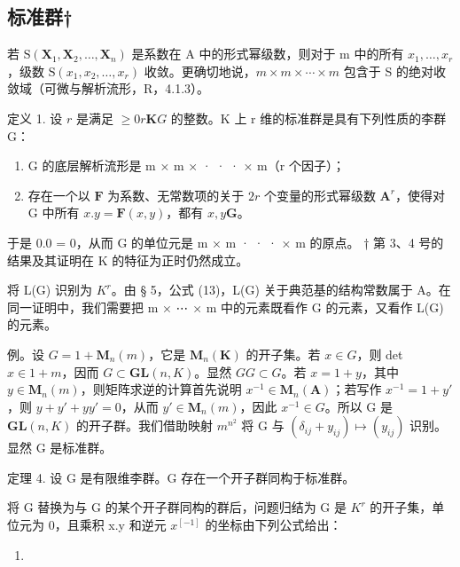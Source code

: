 \subsection{标准群†}

若 \(\mathrm{S}(\mathbf{X}_{1},\mathbf{X}_{2},\ldots,\mathbf{X}_{n})\) 是系数在 A 中的形式幂级数，则对于 m 中的所有 \(x_{1},\ldots,x_{r}\)，级数 \(\mathrm{S}(x_{1},x_{2},\ldots,x_{r})\) 收敛。更确切地说，\(m\times m\times\cdots\times m\) 包含于 S 的绝对收敛域（可微与解析流形，R，4.1.3）。

定义 1. 设 \(r\) 是满足 \(\geqslant 0\)\(r\)\(\mathbf{K}\)\(G\) 的整数。K 上 r 维的标准群是具有下列性质的李群 G：

\begin{enumerate}
\def\labelenumi{(\roman{enumi})}
\item
  G 的底层解析流形是 m × m × · · · × m（r 个因子）；
\item
  存在一个以 \(\mathbf{F}\) 为系数、无常数项的关于 \(2r\) 个变量的形式幂级数 \(\mathbf{A}^r\)，使得对 G 中所有 \(x.y = \mathbf{F}(x,y)\)，都有 \(x,y\)\(\mathbf{G}\)。
\end{enumerate}

于是 0.0 = 0，从而 G 的单位元是 m × m · · · × m 的原点。
† 第 3、4 号的结果及其证明在 K 的特征为正时仍然成立。

将 L(G) 识别为 \(K^r\)。由 § 5，公式 (13)，L(G) 关于典范基的结构常数属于 A。在同一证明中，我们需要把 m × ⋯ × m 中的元素既看作 G 的元素，又看作 L(G) 的元素。

例。设 \(G = 1 + \mathbf{M}_{n}(m)\)，它是 \(\mathbf{M}_{n}(\mathbf{K})\) 的开子集。若 \(x \in G\)，则 det \(x \in 1 + m\)，因而 \(G \subset \mathbf{GL}(n, K)\)。显然 \(GG \subset G\)。若 \(x = 1 + y\)，其中 \(y \in \mathbf{M}_{n}(m)\)，则矩阵求逆的计算首先说明 \(x^{-1} \in \mathbf{M}_{n}(\mathbf{A})\)；若写作 \(x^{-1} = 1 + y'\)，则 \(y + y' + yy' = 0\)，从而 \(y' \in \mathbf{M}_{n}(m)\)，因此 \(x^{-1} \in G\)。所以 G 是 \(\mathbf{GL}(n, K)\) 的开子群。我们借助映射 \(m^{n^2}\) 将 G 与 \((\delta_{ij} + y_{ij}) \mapsto (y_{ij})\) 识别。显然 G 是标准群。

定理 4. 设 G 是有限维李群。G 存在一个开子群同构于标准群。

将 G 替换为与 G 的某个开子群同构的群后，问题归结为 G 是 \(K^{r}\) 的开子集，单位元为 0，且乘积 x.y 和逆元 \(x^{[-1]}\) 的坐标由下列公式给出：

\begin{enumerate}
\def\labelenumi{(\arabic{enumi})}
\setcounter{enumi}{2}
\tightlist
\item
\end{enumerate}


